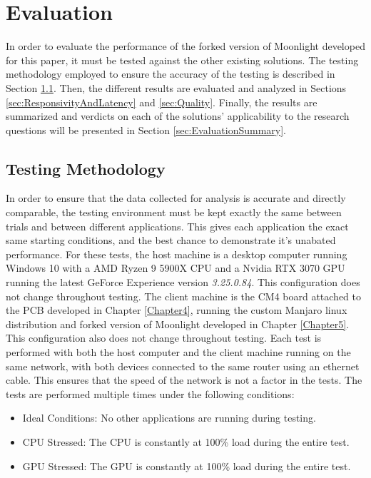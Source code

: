 \chapter{Evaluation} %

\label{Chapter6} %

In order to evaluate the performance of the forked version of Moonlight developed for this paper, it must be tested against the other existing solutions.
The testing methodology employed to ensure the accuracy of the testing is described in Section \ref{sec:TestingMethodology}.
Then, the different results are evaluated and analyzed in Sections \ref{sec:ResponsivityAndLatency} and \ref{sec:Quality}.
Finally, the results are summarized and verdicts on each of the solutions' applicability to the research questions will be presented in Section \ref{sec:EvaluationSummary}.


\section{Testing Methodology}\label{sec:TestingMethodology}

In order to ensure that the data collected for analysis is accurate and directly comparable, the testing environment must be kept exactly the same between trials and between different applications.
This gives each application the exact same starting conditions, and the best chance to demonstrate it's unabated performance.
For these tests, the host machine is a desktop computer running Windows 10 with a AMD Ryzen 9 5900X CPU and a Nvidia RTX 3070 GPU running the latest GeForce Experience version \emph{3.25.0.84}.
This configuration does not change throughout testing.
The client machine is the CM4 board attached to the PCB developed in Chapter \ref{Chapter4}, running the custom Manjaro linux distribution and forked version of Moonlight developed in Chapter \ref{Chapter5}.
This configuration also does not change throughout testing.
Each test is performed with both the host computer and the client machine running on the same network, with both devices connected to the same router using an ethernet cable.
This ensures that the speed of the network is not a factor in the tests.
The tests are performed multiple times under the following conditions:

\begin{itemize}
  \item Ideal Conditions: No other applications are running during testing.
  \item CPU Stressed: The CPU is constantly at 100\% load during the entire test.
  \item GPU Stressed: The GPU is constantly at 100\% load during the entire test.
\end{itemize}


